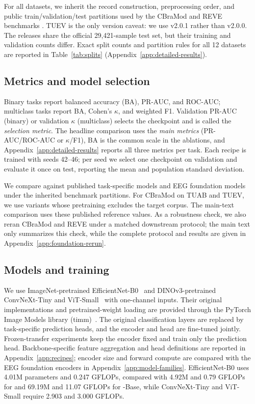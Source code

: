 For all datasets, we inherit the record construction, preprocessing order, and
public train/validation/test partitions used by the CBraMod and REVE benchmarks
\citep{wang2025cbramod,elouahidi2025reve}. TUEV is the only version caveat: we
use v2.0.1 rather than v2.0.0. The releases share the official 29,421-sample
test set, but their training and validation counts differ. Exact split counts
and partition rules for all 12 datasets are reported in
Table~\ref{tab:splits} (Appendix~\ref{app:detailed-results}).

\subsection{Metrics and model selection}

Binary tasks report balanced accuracy (BA), PR-AUC, and ROC-AUC; multiclass
tasks report BA, Cohen's $\kappa$, and weighted F1. Validation PR-AUC (binary)
or validation $\kappa$ (multiclass) selects the checkpoint and is called the
\emph{selection metric}. The headline comparison uses the \emph{main metrics}
(PR-AUC/ROC-AUC or $\kappa$/F1), BA is the common scale in the ablations, and
Appendix~\ref{app:detailed-results} reports all three metrics per task. Each
recipe is trained with seeds 42--46; per seed we select one checkpoint on
validation and evaluate it once on test, reporting the mean and population
standard deviation.

We compare against published task-specific models and EEG foundation models
under the inherited benchmark partitions. For CBraMod on TUAB and TUEV, we
use variants whose pretraining excludes the target corpus. The main-text
comparison uses these published reference values. As a robustness check, we
also reran CBraMod and REVE under a matched downstream
protocol; the main text only summarizes this check, while the complete
protocol and results are given in Appendix~\ref{app:foundation-rerun}.

\subsection{Models and training}

We use ImageNet-pretrained EfficientNet-B0~\citep{tan2019efficientnet} and DINOv3-pretrained
ConvNeXt-Tiny and ViT-Small~\citep{oquab2025dinov3} with one-channel inputs. Their original
implementations and pretrained-weight loading are provided through the
PyTorch Image Models library (timm)~\citep{rw2019timm}. The original
classification layers are replaced by task-specific prediction heads, and the
encoder and head are fine-tuned jointly. Frozen-transfer experiments keep the
encoder fixed and train only the prediction head. Backbone-specific feature
aggregation and head definitions are reported in Appendix~\ref{app:recipes};
encoder size and forward compute are compared with the EEG foundation encoders
in Appendix~\ref{app:model-families}. EfficientNet-B0 uses 4.01M parameters
and 0.247 GFLOPs, compared with 4.92M and 0.79 GFLOPs for \cbramod{} and
69.19M and 11.07 GFLOPs for \reve{}-Base, while ConvNeXt-Tiny and ViT-Small
require 2.903 and 3.000 GFLOPs.

